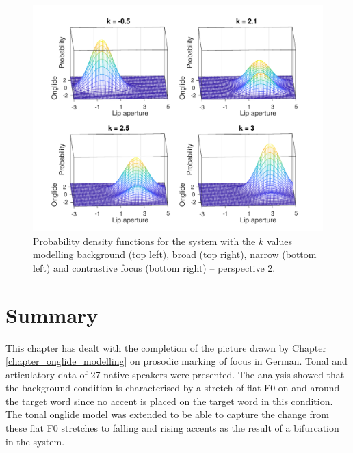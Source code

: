 \begin{figure}[htbp]
\begin{center}
\includegraphics[width=\textwidth]{figures/ch7/probabilities2.pdf}
\caption[Probability density functions for the system with the $k$ values modelling background, broad, narrow and contrastive focus -- perspective 2.]{Probability density functions for the system with the $k$ values modelling background (top left), broad (top right), narrow (bottom left) and contrastive focus (bottom right) -- perspective 2.}
\label{fig:3d_probs2}
\end{center}
\end{figure}

\section{Summary}

This chapter has dealt with the completion of the picture drawn by Chapter \ref{chapter_onglide_modelling} on prosodic marking of focus in German. Tonal and articulatory data of 27 native speakers were presented. The analysis showed that the background condition is characterised by a stretch of flat F0 on and around the target word since no accent is placed on the target word in this condition. The tonal onglide model was extended to be able to capture the change from these flat F0 stretches to falling and rising accents as the result of a bifurcation in the system. 

